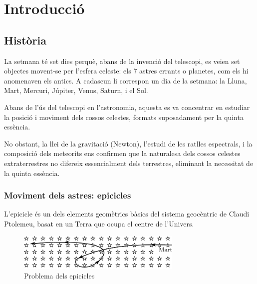 \section{Introducció}
\subsection{Història}
La setmana té set dies perquè, abans de la invenció del telescopi, es veien set objectes movent-se per l'esfera celeste: els 7 astres errants o planetes, com els hi anomenaven els antics. A cadascun li correspon un dia de la setmana: la Lluna, Mart, Mercuri, Júpiter, Venus, Saturn, i el Sol.

Abans de l'ús del telescopi en l'astronomia, aquesta es va concentrar en estudiar la posició i moviment dels cossos celestes, formats suposadament per la quinta essència.

No obstant, la llei de la gravitació (Newton), l'estudi de les ratlles espectrals, i la composició dels meteorits ens confirmen que la naturalesa dels cossos celestes extraterrestres no difereix essencialment dels terrestres, eliminant la necessitat de la quinta essència.

\subsubsection*{Moviment dels astres: epicicles}
L'epicicle és un dels elements geomètrics bàsics del sistema geocèntric de Claudi Ptolemeu, basat en un Terra que ocupa el centre de l'Univers.
\begin{figure}[h]
	\centering
	\includegraphics[width=0.7\textwidth]{./images/1-epicycles-a}
	\caption{Problema dels epicicles}
	\label{fig:epicycles-a}
\end{figure}

